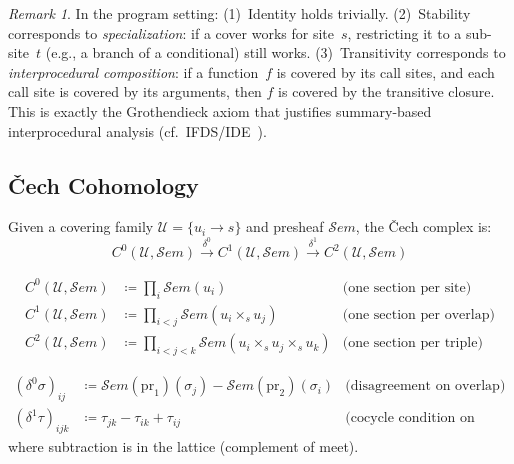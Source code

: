 \documentclass[acmsmall,screen,review,anonymous]{acmart}
\theoremstyle{remark}
\newtheorem{remark}[theorem]{Remark}
\newcommand{\Sem}{\mathcal{S}\mathit{em}}
\newcommand{\defeq}{\coloneqq}
\begin{document}
\begin{remark}
In the program setting: (1)~Identity holds trivially.
(2)~Stability corresponds to \emph{specialization}: if a cover works
for site~$s$, restricting it to a sub-site~$t$ (e.g., a branch of a
conditional) still works.
(3)~Transitivity corresponds to \emph{interprocedural composition}:
if a function~$f$ is covered by its call sites, and each call site is
covered by its arguments, then $f$ is covered by the transitive closure.
This is exactly the Grothendieck axiom that justifies summary-based
interprocedural analysis (cf.\ IFDS/IDE~\cite{RepsHorwitzSagiv95}).
\end{remark}

\subsection{\v{C}ech Cohomology}\label{sec:cech}

Given a covering family $\mathcal{U} = \{ u_i \to s \}$ and presheaf
$\Sem$, the \v{C}ech complex is:
\[
  C^0(\mathcal{U}, \Sem) \xrightarrow{\delta^0}
  C^1(\mathcal{U}, \Sem) \xrightarrow{\delta^1}
  C^2(\mathcal{U}, \Sem)
\]

\begin{definition}\label{def:cech-cochains}
\begin{align*}
  C^0(\mathcal{U}, \Sem) &\defeq \prod_{i} \Sem(u_i)
    & \text{(one section per site)} \\
  C^1(\mathcal{U}, \Sem) &\defeq \prod_{i < j} \Sem(u_i \times_s u_j)
    & \text{(one section per overlap)} \\
  C^2(\mathcal{U}, \Sem) &\defeq \prod_{i < j < k}
    \Sem(u_i \times_s u_j \times_s u_k)
    & \text{(one section per triple)}
\end{align*}
\end{definition}

\begin{definition}\label{def:coboundary}
\begin{align*}
  (\delta^0 \sigma)_{ij} &\defeq
    \Sem(\mathrm{pr}_1)(\sigma_j) - \Sem(\mathrm{pr}_2)(\sigma_i)
    & \text{(disagreement on overlap)} \\
  (\delta^1 \tau)_{ijk} &\defeq
    \tau_{jk} - \tau_{ik} + \tau_{ij}
    & \text{(cocycle condition on triples)}
\end{align*}
where subtraction is in the lattice (complement of meet).
\end{definition}
\end{document}
